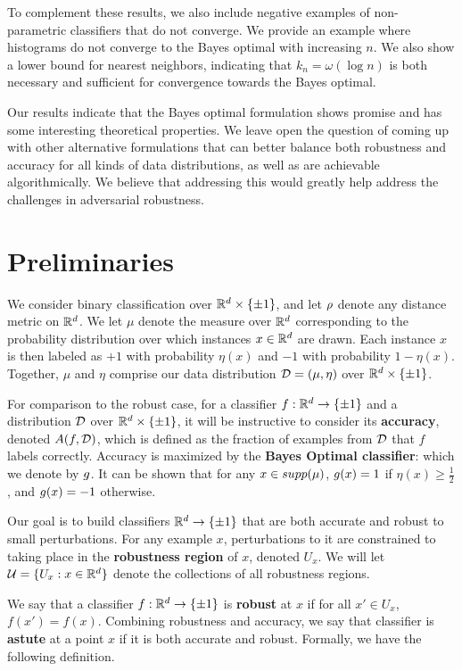 To complement these results, we also include negative examples of non-parametric classifiers that do not converge. We provide an example where histograms do not converge to the \natural\emph{ }Bayes optimal with increasing $n$. We also show a lower bound for nearest neighbors, indicating that $k_n = \omega(\log n)$ is both necessary and sufficient for convergence towards the \natural\emph{ }Bayes optimal. 

Our results indicate that the \natural\emph{ }Bayes optimal formulation shows promise and has some interesting theoretical properties. We leave open the question of coming up with other alternative formulations that can better balance both robustness and accuracy for all kinds of data distributions, as well as are achievable algorithmically. We believe that addressing this would greatly help address the challenges in adversarial robustness.

\section{Preliminaries}


We consider binary classification over $\mathbb R^d \times \{\pm 1\}$, and let $\rho$ denote any distance metric on $\mathbb R^d$. We let $\mu$ denote the measure over $\mathbb R^d$ corresponding to the probability distribution over which instances $x \in \mathbb R^d$ are drawn. Each instance $x$ is then labeled as $+1$ with probability $\eta(x)$  and $-1$ with probability $1 - \eta(x)$. Together, $\mu$ and $\eta$ comprise our data distribution ${\mathcal D} = (\mu, \eta)$ over $\mathbb R^d \times \{\pm 1\}$. 


For comparison to the robust case, for a classifier $f: \mathbb R^d \to \{\pm 1\}$ and a distribution ${\mathcal D}$ over $\mathbb R^d \times \{\pm 1\}$, it will be instructive to consider its  \textbf{accuracy},  denoted $A(f, {\mathcal D})$, which is defined as the fraction of examples from ${\mathcal D}$ that $f$ labels correctly. Accuracy is maximized by the \textbf{Bayes Optimal classifier}: which we denote by $g$. It can be shown that for any $x \in supp(\mu)$, $g(x) = 1$ if $\eta(x) \geq \frac{1}{2}$, and $g(x) = -1$ otherwise. 

Our goal is to build classifiers $\mathbb R^d \to \{\pm 1\}$ that are both accurate and robust to small perturbations. For any example $x$, perturbations to it are constrained to taking place in the \textbf{robustness region} of $x$, denoted $U_x$. We will let ${\mathcal U} = \{U_x: x \in \mathbb R^d\}$ denote the collections of all robustness regions. 

We say that a classifier $f: \mathbb R^d \to \{\pm 1\}$ is \textbf{robust} at $x$ if for all $x' \in U_x$, $f(x') = f(x)$. Combining robustness and accuracy, we say that classifier is \textbf{astute} at a point $x$ if it is both accurate and robust. Formally, we have the following definition. 


